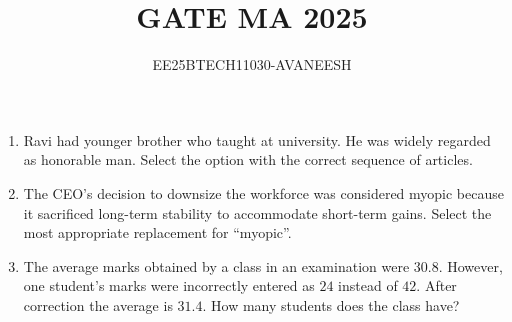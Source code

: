 \documentclass[journal,12pt,onecolumn]{IEEEtran}
\title{GATE MA 2025}
\author{EE25BTECH11030-AVANEESH}
\theoremstyle{remark}
\begin{document}
\maketitle
\begin{enumerate}

\item Ravi had \underline{\hspace{2cm}} younger brother who taught at \underline{\hspace{2cm}} university. He was widely regarded as \underline{\hspace{2cm}} honorable man. Select the option with the correct sequence of articles.


\begin{enumerate}
\end{enumerate}
\hfill{}

\item The CEO's decision to downsize the workforce was considered myopic because it sacrificed long-term stability to accommodate short-term gains. Select the most appropriate replacement for “myopic”.

\begin{enumerate}
\end{enumerate}
\hfill{}

\item The average marks obtained by a class in an examination were $30.8$. However, one student’s marks were incorrectly entered as $24$ instead of $42$. After correction the average is $31.4$. How many students does the class have?

\begin{enumerate}
\end{enumerate}
\hfill{}


\end{enumerate}
\end{document}
